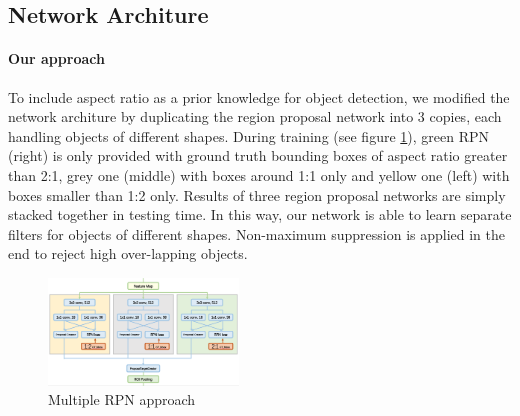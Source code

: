 \documentclass[10pt,twocolumn,letterpaper]{article}
\begin{document}
\subsection{Network Architure}
\paragraph{Our approach}
To include aspect ratio as a prior knowledge for object detection, we modified the network architure by duplicating the region proposal network into 3 copies, each handling objects of different shapes. During training (see figure \ref{ARS_De}), green RPN (right) is only provided with ground truth bounding boxes of aspect ratio greater than 2:1, grey one (middle) with boxes around 1:1 only and yellow one (left) with boxes smaller than 1:2 only. Results of three region proposal networks are simply stacked together in testing time. In this way, our network is able to learn separate filters for objects of different shapes. Non-maximum suppression is applied in the end to reject high over-lapping objects. 
    \begin{figure}[!htb]
    \includegraphics[width= 0.45\textwidth]{pic/ARS-archi-detail.png}
    \caption{Multiple RPN approach}
    \label{ARS_De}
    \end{figure}
\end{document}
